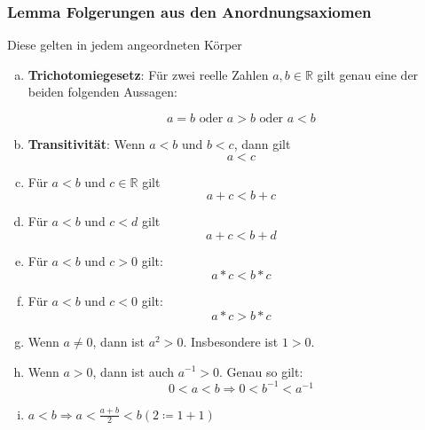 \documentclass{article}
\begin{document}
\subsubsection{Lemma Folgerungen aus den Anordnungsaxiomen}
\label{sec:1.2.3}

Diese gelten in jedem angeordneten Körper

\begin{enumerate}[(a)]
\item \textbf{Trichotomiegesetz}: Für zwei reelle Zahlen $a, b \in \mathbb{R}$ gilt genau eine der beiden folgenden
  Aussagen:

  \[
    a = b \text{ oder } a > b \text{ oder } a < b
  \]
\item \textbf{Transitivität}: Wenn $a < b$ und $b < c$, dann gilt
  \[
    a < c
  \]
\item Für $a < b$ und $c \in \mathbb{R}$ gilt
  \[
    a + c < b + c
  \]
\item \label{sec:1.2.3_d} Für $a < b$ und $c < d$ gilt
  \[
    a + c < b + d
  \]
\item Für $a < b$ und $c > 0$ gilt:
  \[
    a * c < b * c
  \]
\item Für $a < b$ und $c < 0$ gilt:
  \[
    a * c > b * c
  \]
\item Wenn $a \ne 0$, dann ist $a^2 > 0$. Insbesondere ist $1 > 0$.
\item Wenn $a > 0$, dann ist auch $a^{-1} > 0$. Genau so gilt:
  \[
    0 < a < b \Rightarrow 0 < b^{-1} < a^{-1}
  \]
\item $a < b \Rightarrow a < \frac{a + b}{2} < b (2 \coloneqq 1 + 1)$ 
\end{enumerate}
\end{document}
